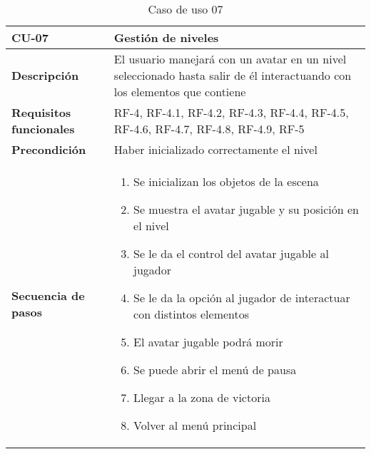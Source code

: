 \begin{longtable}{l|l}
\caption{Caso de uso 07}\\
\begin{minipage}{0.25\columnwidth}
\textbf{CU-07} 
\end{minipage}
&
\begin{minipage}{0.65\columnwidth}
Gestión de niveles
\end{minipage}
\\ \hline

\begin{minipage}{0.25\columnwidth}
\textbf{Descripción} 
\end{minipage}
&
\begin{minipage}{0.65\columnwidth}
El usuario manejará con un avatar en un nivel seleccionado hasta salir de él interactuando con los elementos que contiene
\end{minipage}
\\ \hline

\begin{minipage}{0.25\columnwidth}
\textbf{Requisitos funcionales} 
\end{minipage}
&
\begin{minipage}{0.65\columnwidth}
RF-4, RF-4.1, RF-4.2, RF-4.3, RF-4.4, RF-4.5, RF-4.6, RF-4.7, RF-4.8, RF-4.9, RF-5
\end{minipage}
\\ \hline

\begin{minipage}{0.25\columnwidth}
\textbf{Precondición} 
\end{minipage}
&
\begin{minipage}{0.65\columnwidth}
Haber inicializado correctamente el nivel
\end{minipage}
\\ \hline

\begin{minipage}{0.25\columnwidth}
\textbf{Secuencia de pasos} 
\end{minipage}
&
\begin{minipage}{0.65\columnwidth}
\begin{enumerate}
\item
Se inicializan los objetos de la escena
\item
Se muestra el avatar jugable y su posición en el nivel
\item
Se le da el control del avatar jugable al jugador
\item
Se le da la opción al jugador de interactuar con distintos elementos
\item
El avatar jugable podrá morir
\item
Se puede abrir el menú de pausa
\item
Llegar a la zona de victoria
\item
Volver al menú principal
\end{enumerate}
\end{minipage}
\\ \hline


\end{longtable}
